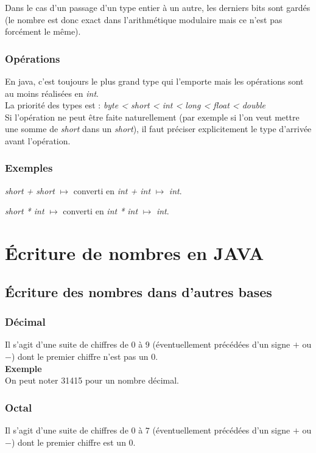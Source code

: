 \documentclass[a4paper,10pt]{book}
\begin{document}
Dans le cas d'un passage d'un type entier à un autre, les derniers bits sont gardés (le nombre est donc exact dans l'arithmétique modulaire mais ce n'est pas forcément le même).

\subsubsection{Opérations}

En java, c'est toujours le plus grand type qui l'emporte mais les opérations sont au moins réalisées en \emph{int}.\\
La priorité des types est : \emph{byte < short < int < long < float < double}\\

Si l'opération ne peut être faite naturellement (par exemple si l'on veut mettre une somme de \textit{short} dans un \textit{short}), il faut préciser explicitement le type d'arrivée avant l'opération.

\subsubsection{Exemples}

\textit{short + short }$\mapsto$ converti en \textit{int + int }$\mapsto$ \textit{int}.

\textit{short * int }$\mapsto$ converti en \textit{int * int }$\mapsto$ \textit{int}.

\section{Écriture de nombres en JAVA}
\subsection{Écriture des nombres dans d'autres bases}
\subsubsection{Décimal}
Il s'agit d'une suite de chiffres de $0$ à $9$ (éventuellement précédées d'un signe $+$ ou $-$) dont le premier chiffre n'est pas un $0$.\\

\textbf{Exemple}\\
On peut noter 31415 pour un nombre décimal.

\subsubsection{Octal}
Il s'agit d'une suite de chiffres de $0$ à $7$ (éventuellement précédées d'un signe $+$ ou $-$) dont le premier chiffre est un $0$.\\
\end{document}
